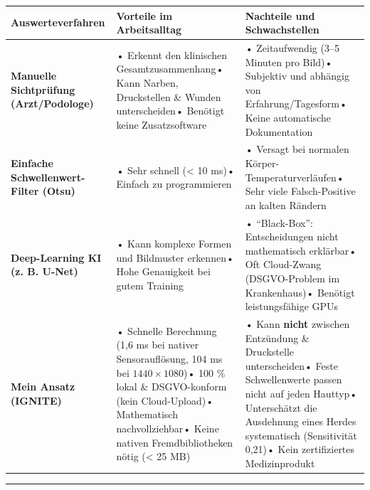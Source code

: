 \documentclass[
  11pt,
]{article}
\newcounter{none} %
\begin{document}
{\def\LTcaptype{none} %
\begin{longtable}[]{@{}
  >{\raggedright\arraybackslash}p{}
  >{\raggedright\arraybackslash}p{}
  >{\raggedright\arraybackslash}p{}@{}}
\toprule\noalign{}
\begin{minipage}[b]{\linewidth}\raggedright
Auswerteverfahren
\end{minipage} & \begin{minipage}[b]{\linewidth}\raggedright
Vorteile im Arbeitsalltag
\end{minipage} & \begin{minipage}[b]{\linewidth}\raggedright
Nachteile und Schwachstellen
\end{minipage} \\
\midrule\noalign{}
\endhead
\bottomrule\noalign{}
\endlastfoot
\textbf{Manuelle Sichtprüfung (Arzt/Podologe)} & • Erkennt den
klinischen Gesamtzusammenhang• Kann Narben, Druckstellen \& Wunden
unterscheiden• Benötigt keine Zusatzsoftware & • Zeitaufwendig (3--5
Minuten pro Bild)• Subjektiv und abhängig von Erfahrung/Tagesform• Keine
automatische Dokumentation \\
\textbf{Einfache Schwellenwert-Filter (Otsu)} & • Sehr schnell
(\textless{} 10 ms)• Einfach zu programmieren & • Versagt bei normalen
Körper-Temperaturverläufen• Sehr viele Falsch-Positive an kalten
Rändern \\
\textbf{Deep-Learning KI (z. B. U-Net)} & • Kann komplexe Formen und
Bildmuster erkennen• Hohe Genauigkeit bei gutem Training & •
``Black-Box'': Entscheidungen nicht mathematisch erklärbar• Oft
Cloud-Zwang (DSGVO-Problem im Krankenhaus)• Benötigt leistungsfähige
GPUs \\
\textbf{Mein Ansatz (IGNITE)} & • Schnelle Berechnung (1,6 ms bei
nativer Sensorauflösung, 104 ms bei \(1440\times1080\))• 100 \% lokal \&
DSGVO-konform (kein Cloud-Upload)• Mathematisch nachvollziehbar• Keine
nativen Fremdbibliotheken nötig (\textless{} 25 MB) & • Kann
\textbf{nicht} zwischen Entzündung \& Druckstelle unterscheiden• Feste
Schwellenwerte passen nicht auf jeden Hauttyp• Unterschätzt die
Ausdehnung eines Herdes systematisch (Sensitivität 0,21)• Kein
zertifiziertes Medizinprodukt \\
\end{longtable}
}

\begin{center}\rule{0.5\linewidth}{0.5pt}\end{center}
\end{document}
